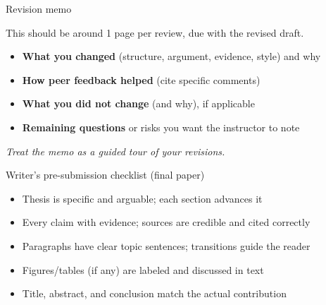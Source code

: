 \documentclass[aspectratio=169]{beamer}
\begin{document}
\begin{frame}{Revision memo}

  This should be around 1 page per review, due with the revised draft.
  
\begin{itemize}
  \item \textbf{What you changed} (structure, argument, evidence, style) and why
  \item \textbf{How peer feedback helped} (cite specific comments)
  \item \textbf{What you did not change} (and why), if applicable
  \item \textbf{Remaining questions} or risks you want the instructor to note
\end{itemize}
\textit{Treat the memo as a guided tour of your revisions.}
\end{frame}

\begin{frame}{Writer's pre-submission checklist (final paper)}
\begin{itemize}
  \item Thesis is specific and arguable; each section advances it
  \item Every claim with evidence; sources are credible and cited correctly
  \item Paragraphs have clear topic sentences; transitions guide the reader
  \item Figures/tables (if any) are labeled and discussed in text
  \item Title, abstract, and conclusion match the actual contribution
\end{itemize}
\end{frame}
\end{document}
